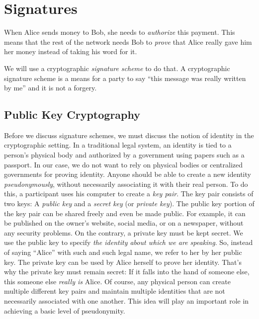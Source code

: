 \section{Signatures}

When Alice sends money to Bob, she needs to \emph{authorize} this payment. This means
that the rest of the network needs Bob to \emph{prove} that Alice really gave him
her money instead of taking his word for it.

We will use a cryptographic \emph{signature scheme} to do that. A cryptographic signature
scheme is a means for a party to say ``this message was really written by me'' and it is
not a forgery.

\subsection*{Public Key Cryptography}

Before we discuss signature schemes, we must discuss the notion of identity in the cryptographic
setting. In a traditional legal system, an identity is tied to a person's physical body
and authorized by a government using papers such as a passport. In our case, we do not want
to rely on physical bodies or centralized governments for proving identity. Anyone should be
able to create a new identity \emph{pseudonymously}, without necessarily associating it with
their real person. To do this, a participant uses his computer to create a \emph{key pair}.
The key pair consists of two keys: A \emph{public key} and a \emph{secret key}
(or \emph{private key}). The public key portion of the key pair can be shared freely and even
be made public. For example, it can be published on the owner's website, social media, or on
a newspaper, without any security problems. On the contrary, a private key must be kept secret.
We use the public key to specify \emph{the identity about which we are speaking}. So, instead
of saying ``Alice'' with such and such legal name, we refer to her by her public
key. The private key can be used by Alice herself to prove her identity. That's why the
private key must remain secret: If it falls into the hand of someone else, this someone
else \emph{really is} Alice. Of course, any physical person can create multiple different
key pairs and maintain multiple identities that are not necessarily associated with one
another. This idea will play an important role in achieving a basic level of pseudonymity.

